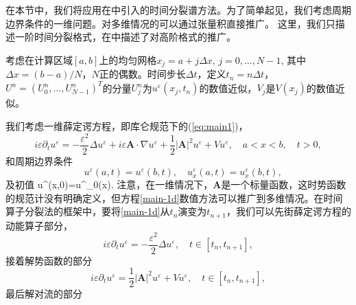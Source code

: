 在本节中，我们将应用在中引入的时间分裂谱方法。为了简单起见，我们考虑周期边界条件的一维问题。对多维情况的可以通过张量积直接推广。
这里，我们只描述一阶时间分裂格式，在中描述了对高阶格式的推广。

考虑在计算区域$[a,b]$上的均匀网格$x_j = a+ j \Delta x,\,j =0,\ldots,N-1$, 其中$\Delta x = (b-a)/N$，$N$正的偶数。时间步长$\Delta t$，定义$t_n=n\Delta t$，$U^{n} = (U_{0}^{n}, \ldots, U_{N-1}^{n})^{T}$的分量$U_{j}^{n}$为$u^{\varepsilon}(x_{j},t_{n})$的数值近似，$V_{j}$是$V(x_{j})$的数值近似。

我们考虑一维薛定谔方程，即库仑规范下的(\ref{eq:main1})，
\begin{equation}\label{main-1d}
    i\varepsilon\partial_t u^\varepsilon=-\frac{\varepsilon^2}{2}\Delta u^\varepsilon+i\varepsilon\mathbf{A}\cdot\nabla u^\varepsilon+\frac{1}{2}|\mathbf{A}|^2 u^\varepsilon+Vu^\varepsilon,
    \quad a<x<b, \quad t>0,
\end{equation}
和周期边界条件
\begin{equation}
    \quad u^\varepsilon(a,t)=u^\varepsilon(b,t),\quad u^\varepsilon_x(a,t)=u^\varepsilon_x(b,t),
\end{equation}
及初值
\bea
u^\varepsilon(x,0)=u^\varepsilon_0(x).
\eea
注意，在一维情况下，$\mathbf{A}$是一个标量函数，这时势函数的规范计没有明确定义，但方程\eqref{main-1d}数值方法可以推广到多维情况。在时间算子分裂法的框架中，要将\eqref{main-1d}从$t_n$演变为$t_{n + 1}$，我们可以先街薛定谔方程的动能算子部分，
\begin{equation}\label{kin-1d}
    i\varepsilon\partial_t u^\varepsilon=-\frac{\varepsilon^2}{2}\Delta u^\varepsilon, \quad t\in [t_n,t_{n+1}],
\end{equation}
接着解势函数的部分
\begin{equation}\label{pot-1d}
    i\varepsilon\partial_t u^\varepsilon=\frac{1}{2}|\mathbf{A}|^2 u^\varepsilon+Vu^\varepsilon,\quad t\in[t_n,t_{n+1}],
\end{equation}
最后解对流的部分
